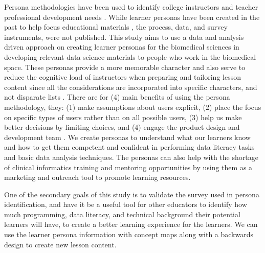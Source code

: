 \documentclass[020-persona\_validation.tex]{subfiles}
\begin{document}
    Persona methodologies have been used to identify
    college instructors and teacher professional development needs
    \cite{zagallo2019through}.
    While learner personas have been created in the past to help focus educational materials
    \cite{RStudio2019, softwarecarpentryLearnerProfiles},
    the process, data, and survey instruments, were not published.
    This study aims to use a data and analysis driven approach on creating learner personas for the biomedical sciences
    in developing relevant data science materials to people who
    work in the biomedical space.
    These personas provide a more memorable character and also serve to reduce the cognitive load of instructors
    when preparing and tailoring lesson content since all the considerations are incorporated into specific characters,
    and not disparate lists
    \cite{pruittPersonaLifecycleKeeping2006, schwartzParadoxChoiceWhy2016, cooperInmatesAreRunning1999}.
    There are for (4) main benefits of using the persona methodology, they:
    (1) make assumptions about users explicit,
    (2) place the focus on specific types of users rather than on all possible users,
    (3) help us make better decisions by limiting choices, and
    (4) engage the product design and development team
    \cite{pruittPersonaLifecycleKeeping2006, schwartzParadoxChoiceWhy2016}.
    We create personas to understand what our learners know and how to get them competent and confident
    in performing data literacy tasks and basic data analysis techniques.
    The personas can also help with the shortage of clinical informatics training and mentoring opportunities
    by using them as a marketing and outreach tool to promote learning resources.


    One of the secondary goals of this study is to validate the survey used in persona identification,
    and have it be a useful tool for other educators to identify how much
    programming, data literacy, and technical background their potential learners will have,
    to create a better learning experience for the learners.
    We can use the learner persona information with concept maps along with a backwards design
    to create new lesson content.
\end{document}
